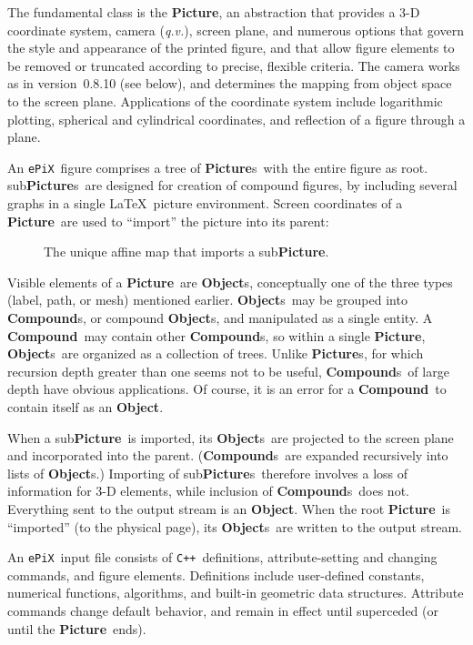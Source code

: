 \documentclass[12pt]{article}
\newcommand{\Class}[1]{\textbf{#1}}
\newcommand{\Code}[1]{\texttt{#1}}
\newcommand{\Program}[1]{\texttt{#1}}
\newcommand{\Compound}{\Class{Compound}}
\newcommand{\Compounds}{\Class{Compound}s}
\newcommand{\Object}{\Class{Object}}
\newcommand{\Objects}{\Class{Object}s}
\newcommand{\Picture}{\Class{Picture}}
\newcommand{\Pictures}{\Class{Picture}s}
\newcommand{\CXX}{\Code{C++}}
\newcommand{\ePiX}{\Program{ePiX}}
\begin{document}
The fundamental class is the \Picture, an abstraction that provides a
3-D coordinate system, camera (\emph{q.v.}), screen plane, and
numerous options that govern the style and appearance of the printed
figure, and that allow figure elements to be removed or truncated
according to precise, flexible criteria. The camera works as in
version~0.8.10 (see below), and determines the mapping from object
space to the screen plane.  Applications of the coordinate system
include logarithmic plotting, spherical and cylindrical coordinates,
and reflection of a figure through a plane.

An \ePiX\ figure comprises a tree of \Pictures\ with the entire figure
as root. sub\Pictures\ are designed for creation of compound figures,
by including several graphs in a single \LaTeX\ picture environment.
Screen coordinates of a \Picture\ are used to ``import''
the picture into its parent:

\begin{figure}[hbt]
\begin{center}

\caption{The unique affine map that imports a sub\Picture.}
\label{fig:import}
\end{center}
\end{figure}

Visible elements of a \Picture\ are \Objects, conceptually one of the
three types (label, path, or mesh) mentioned earlier. \Objects\ may be
grouped into \Compounds, or compound \Objects, and manipulated as a
single entity. A \Compound\ may contain other \Compounds, so within
a single \Picture, \Objects\ are organized as a collection of trees.
Unlike \Pictures, for which recursion depth greater than one seems not
to be useful, \Compounds\ of large depth have obvious applications.
Of course, it is an error for a \Compound\ to contain itself as an
\Object.

When a sub\Picture\ is imported, its \Objects\ are projected to the
screen plane and incorporated into the parent.  (\Compounds\ are
expanded recursively into lists of \Objects.)  Importing of
sub\Pictures\ therefore involves a loss of information for 3-D
elements, while inclusion of \Compounds\ does not.  Everything sent
to the output stream is an \Object.  When the root \Picture\ is
``imported'' (to the physical page), its \Objects\ are written to the
output stream.

An \ePiX\ input file consists of \CXX\ definitions, attribute-setting
and changing commands, and figure elements. Definitions include
user-defined constants, numerical functions, algorithms, and built-in
geometric data structures. Attribute commands change default behavior,
and remain in effect until superceded (or until the \Picture\ ends).
\end{document}
